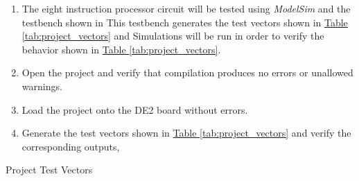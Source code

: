 \begin{enumerate}
    \item The eight instruction processor circuit will be tested using \emph{ModelSim} and the testbench shown in %
    This testbench generates the test vectors shown in \hyperref[tab:project_vectors]{Table \ref*{tab:project_vectors}} and %
    Simulations will be run in order to verify the behavior shown in \hyperref[tab:project_vectors]{Table \ref*{tab:project_vectors}}.
    \item Open the project and verify that compilation produces no errors or unallowed warnings.
    \item Load the project onto the DE2 board without errors.
    \item Generate the test vectors shown in \hyperref[tab:project_vectors]{Table \ref*{tab:project_vectors}} and verify the corresponding outputs,%
\end{enumerate}

\begin{table}[htbp]
    \centering
    \caption{Project Test Vectors\label{tab:project_vectors}}
\end{table}

